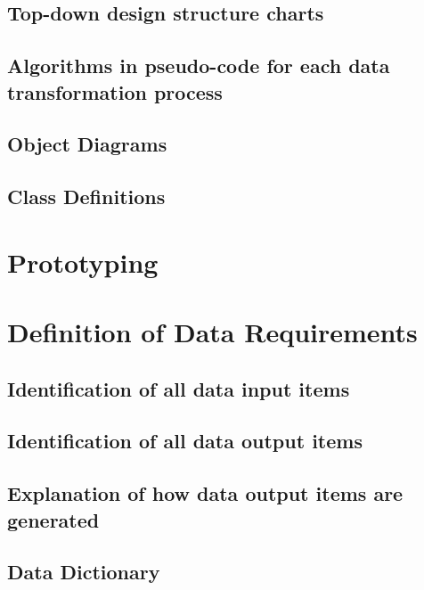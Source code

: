 \subsection{Top-down design structure charts}

\subsection{Algorithms in pseudo-code for each data transformation process}

\subsection{Object Diagrams}

\subsection{Class Definitions}

\section{Prototyping}

\section{Definition of Data Requirements}

\subsection{Identification of all data input items}

\subsection{Identification of all data output items}

\subsection{Explanation of how data output items are generated}

\subsection{Data Dictionary}

